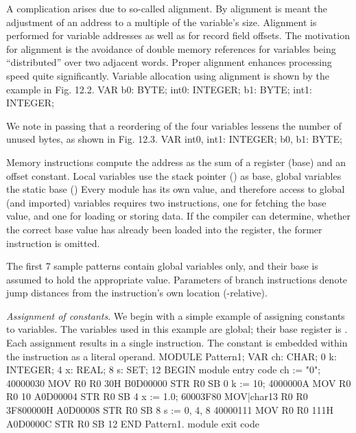 A complication arises due to so-called alignment. By alignment is meant the adjustment of an address to a multiple of the variable's size. Alignment is performed for variable addresses as well as for record field offsets. The motivation for alignment is the avoidance of double memory references for variables being ``distributed'' over two adjacent words. Proper alignment enhances processing speed quite significantly. Variable allocation using alignment is shown by the example in Fig. 12.2.
\begintt
VAR b0: BYTE; int0: INTEGER; b1: BYTE; int1: INTEGER;
\endtt


\noindent We note in passing that a reordering of the four variables lessens the number of unused bytes, as shown in Fig. 12.3.
\begintt
VAR int0, int1: INTEGER; b0, b1: BYTE;
\endtt


Memory instructions compute the address as the sum of a register (base) and an offset constant. Local variables use the stack pointer  () as base, global variables the static base  () Every module has its own  value, and therefore access to global (and imported) variables requires two instructions, one for fetching the base value, and one for loading or storing data. If the compiler can determine, whether the correct base value has already been loaded into the  register, the former instruction is omitted.

The first 7 sample patterns contain global variables only, and their base  is assumed to hold the appropriate value. Parameters of branch instructions denote jump distances from the instruction's own location (-relative).

 \emph{Assignment of constants}. We begin with a simple example of assigning constants to variables. The variables used in this example are global; their base register is . Each assignment results in a single instruction. The constant is embedded within the instruction as a literal operand.
\eject %
\begintt
MODULE Pattern1;
  VAR ch: CHAR;                 0
    k: INTEGER;                 4
    x: REAL;                    8
    s: SET;                     12
BEGIN                                     module entry code
  ch := "0";                    40000030  MOV  R0 R0 30H
                                B0D00000  STR  R0 SB 0
  k := 10;                      4000000A  MOV  R0 R0 10
                                A0D00004  STR  R0 SB 4
  x := 1.0;                     60003F80  MOV|char13 R0 R0 3F800000H
                                A0D00008  STR  R0 SB 8
  s := {0, 4, 8}                40000111  MOV  R0 R0 111H
                                A0D0000C  STR  R0 SB 12
END Pattern1.                             module exit code
\endtt

